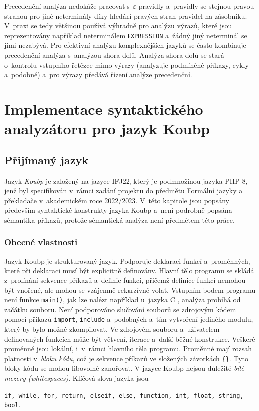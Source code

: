 Precedenční analýza nedokáže pracovat s~$\varepsilon$-pravidly a~pravidly se stejnou pravou stranou pro jiné neterminály díky hledání pravých stran pravidel na zásobníku.
V~praxi se tedy většinou používá výhradně pro analýzu výrazů, které jsou reprezentovány například neterminálem \texttt{EXPRESSION} a~žádný jiný neterminál se jimi nezabývá.
Pro efektivní analýzu komplexnějších jazyků se často kombinuje precedenční analýza s~analýzou shora dolů.
Analýza shora dolů se stará o~kontrolu vstupního řetězce mimo výrazy (analyzuje podmíněné příkazy, cykly a~podobně) a~pro výrazy předává řízení analýze precedenční.

\chapter{Implementace syntaktického analyzátoru pro jazyk Koubp}\label{kap_implementace}

\section{Přijímaný jazyk}\label{kap_prijimany_jazyk}

Jazyk \emph{Koubp} je založený na jazyce IFJ22, který je podmnožinou jazyka PHP 8, jenž byl specifikován v~rámci zadání projektu do předmětu Formální jazyky a překladače v~akademickém roce 2022/2023.
V~této kapitole jsou popsány především syntaktické konstrukty jazyka Koubp a~není podrobně popsána sémantika příkazů, protože sémantická analýza není předmětem této práce.

\subsection*{Obecné vlastnosti}
Jazyk Koubp je strukturovaný jazyk.
Podporuje deklaraci funkcí a~proměnných, které při deklaraci musí být explicitně definovány.
Hlavní tělo programu se skládá z~prolínání sekvence příkazů a~definic funkcí, přičemž definice funkcí nemohou být vnořené, ale mohou se vzájemně rekurzívně volat.
Vstupním bodem programu není funkce \texttt{main()}, jak lze nalézt například u~jazyka C \cite{ISO-C-Standard}, analýza probíhá od začátku souboru.
Není podporováno slučování souborů se zdrojovým kódem pomocí příkazů \texttt{import}, \texttt{include} a~podobných a~tím vytvoření jediného modulu, který by bylo možné zkompilovat.
Ve zdrojovém souboru a~uživatelem definovaných funkcích může být větvení, iterace a~další běžné konstrukce.
Veškeré proměnné jsou lokální, i~v~rámci hlavního těla programu.
Proměnné mají rozsah platnosti v~\emph{bloku kódu}, což je sekvence příkazů ve složených závorkách \texttt{\{\}}.
Tyto bloky kódu se mohou libovolně zanořovat.
V jazyce Koubp nejsou důležité \emph{bílé mezery (whitespaces)}.
Klíčová slova jazyka jsou
\begin{center}
    \texttt{if, while, for, return, elseif, else, function, int, float, string, bool}.
\end{center}

